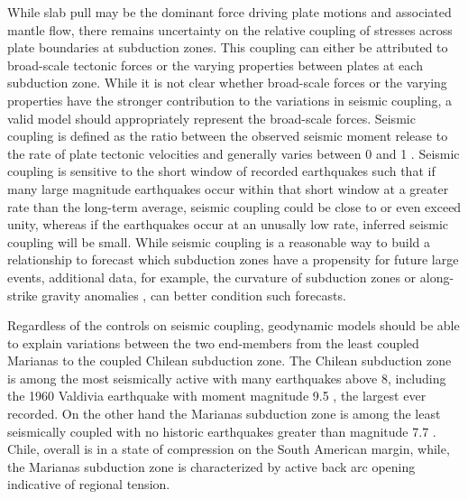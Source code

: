\documentclass[12pt]{article}
\begin{document}
While slab pull may be the dominant force driving plate motions and associated mantle flow, there remains uncertainty on the relative coupling of stresses across plate boundaries at subduction zones. This coupling can either be attributed to broad-scale tectonic forces or the varying properties between plates at each subduction zone. While it is not clear whether broad-scale forces or the varying properties have the stronger contribution to the variations in seismic coupling, a valid model should appropriately represent the broad-scale forces. 
Seismic coupling is defined as the ratio between the observed seismic moment release to the rate of plate tectonic velocities and generally varies between 0 and 1 \citep{davies1971regional}. 
Seismic coupling is sensitive to the short window of recorded earthquakes such that if many large magnitude earthquakes occur within that short window 
at a greater rate than the long-term average, seismic coupling could be close to or even exceed unity, whereas if the earthquakes occur at an unusally low rate, inferred seismic coupling will be small.  While seismic coupling is a reasonable way to build a relationship to forecast which subduction zones have a propensity for future large events, additional data, for example, the curvature of subduction zones \citep{bletery2016mega} or along-strike gravity anomalies \citep{song2003large}, 
can better condition such forecasts. 


Regardless of the controls on seismic coupling, geodynamic models should be able to explain variations between the two end-members from the least coupled Marianas to the coupled Chilean subduction zone. 
The Chilean subduction zone is among the most seismically active with many earthquakes above 8, including the 1960 Valdivia earthquake with moment magnitude 9.5 \citep{kanamori1974},
the largest ever recorded. 
On the other hand the Marianas subduction zone is among the least seismically coupled with no historic earthquakes greater than magnitude 7.7 \citep{mccaffrey2008global}. 
Chile, overall is in a state of compression on the South American margin, while, the Marianas subduction zone is characterized by active back arc opening indicative of regional tension.
\end{document}
